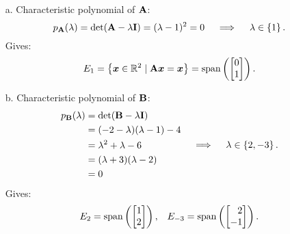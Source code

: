\documentclass[11pt]{article}
\begin{document}
\begin{enumerate}
          \begin{enumerate}
              \item [a.] Characteristic polynomial of $\mathbf{A}$:
                    \[
                        p_{\mathbf{A}}(\lambda)
                        = \det(\mathbf{A} - \lambda \mathbf{I})
                        = (\lambda - 1)^2
                        = 0
                        \quad \implies \quad
                        \lambda \in \left\{1\right\}.
                    \]
                    Gives:
                    \[
                        E_1 = \left\{ \bm{x} \in \mathbb{R}^2 \mid \mathbf{A} \bm{x} = \bm{x} \right\} = \operatorname{span} \left(
                            \begin{bmatrix}
                                0 \\ 1
                            \end{bmatrix}
                        \right).
                    \]

              \item [b.] Characteristic polynomial of $\mathbf{B}$:
                    \[
                        \begin{aligned}
                            p_{\mathbf{B}}(\lambda)
                             & = \det(\mathbf{B} - \lambda \mathbf{I}) \\
                             & = (-2 - \lambda)(\lambda - 1) - 4 \\
                             & = \lambda^2 + \lambda - 6         \\
                             & = (\lambda + 3)(\lambda - 2)      \\
                             & = 0
                        \end{aligned}
                        \quad \implies \quad
                        \lambda \in \left\{2, -3\right\}.
                    \]
                    Gives:
                    \[
                        \begin{aligned}
                            E_2
                            = \Span \args{
                                \begin{bmatrix}
                                    1 \\ 2
                                \end{bmatrix}
                            },
                        \end{aligned}
                        \quad
                        \begin{aligned}
                            E_{-3}
                            = \Span \args{
                                \begin{bmatrix*}[r]
                                    2 \\ -1
                                \end{bmatrix*}
                            }.
                        \end{aligned}
                    \]
          \end{enumerate}


\end{enumerate}
\end{document}
